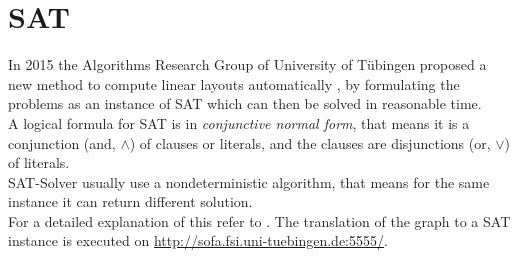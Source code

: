 \section{SAT}
\label{SAT}
In 2015 the Algorithms Research Group of University of Tübingen proposed a new method to compute linear layouts automatically \cite{Bekos2015TheBE}, by formulating the problems as an instance of SAT which can then be solved in reasonable time.\\
A logical formula for SAT is in \textit{conjunctive normal form}, that means it is a conjunction (and, $\land$) of clauses or literals, and the clauses are disjunctions (or, $\lor$) of literals.\\
SAT-Solver usually use a nondeterministic algorithm, that means for the same instance it can return different solution.\\
For a detailed explanation of this refer to \cite{Bekos2015TheBE, jess}. The translation of the graph to a SAT instance is executed on \url{http://sofa.fsi.uni-tuebingen.de:5555/}.
